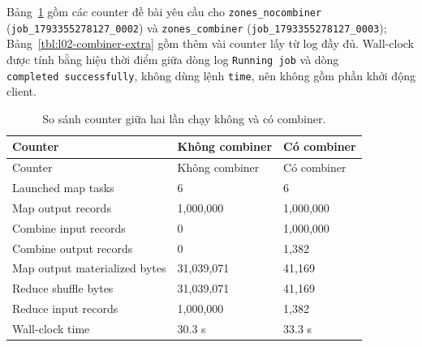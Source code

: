 \documentclass[
  12pt,
  a4paper,
]{article}
\newenvironment{Shaded}{}{}
\newcommand{\AttributeTok}[1]{\textcolor[rgb]{0.49,0.56,0.16}{#1}}
\newcommand{\DataTypeTok}[1]{\textcolor[rgb]{0.56,0.13,0.00}{#1}}
\newcommand{\ExtensionTok}[1]{#1}
\newcommand{\NormalTok}[1]{#1}
\newcommand{\StringTok}[1]{\textcolor[rgb]{0.25,0.44,0.63}{#1}}
\newcommand{\VariableTok}[1]{\textcolor[rgb]{0.10,0.09,0.49}{#1}}
\begin{document}
\begin{Shaded}
\end{Shaded}

Bảng~\ref{tbl:l02-combiner} gồm các counter đề bài yêu cầu cho
\texttt{zones\_}\allowbreak{}\texttt{nocombiner}\allowbreak{}
(\texttt{job\_}\allowbreak{}\texttt{1793355278127\_}\allowbreak{}\texttt{0002}\allowbreak{})
và \texttt{zones\_combiner}
(\texttt{job\_}\allowbreak{}\texttt{1793355278127\_}\allowbreak{}\texttt{0003}\allowbreak{});
Bảng~\ref{tbl:l02-combiner-extra} gồm thêm vài counter lấy từ log đầy
đủ. Wall-clock được tính bằng hiệu thời điểm giữa dòng log
\texttt{Running\ job} và dòng
\texttt{completed\ successfully}\allowbreak{}, không dùng lệnh
\texttt{time}, nên không gồm phần khởi động client.

\begin{longtable}[]{@{}lll@{}}
\caption{\label{tbl:l02-combiner}So sánh counter giữa hai lần chạy không
và có combiner.}\tabularnewline
\toprule\noalign{}
Counter & Không combiner & Có combiner \\
\midrule\noalign{}
\endfirsthead
\toprule\noalign{}
Counter & Không combiner & Có combiner \\
\midrule\noalign{}
\endhead
\bottomrule\noalign{}
\endlastfoot
Launched map tasks & 6 & 6 \\
Map output records & 1,000,000 & 1,000,000 \\
Combine input records & 0 & 1,000,000 \\
Combine output records & 0 & 1,382 \\
Map output materialized bytes & 31,039,071 & 41,169 \\
Reduce shuffle bytes & 31,039,071 & 41,169 \\
Reduce input records & 1,000,000 & 1,382 \\
Wall-clock time & 30.3 s & 33.3 s \\
\end{longtable}
\end{document}
